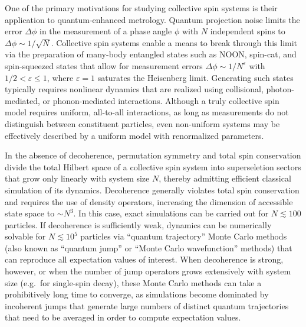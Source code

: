 \documentclass[pra,twocolumn,longbibliography]{revtex4-2}
\newcommand{\1}{\mathds{1}}
\begin{document}
One of the primary motivations for studying collective spin systems is
their application to quantum-enhanced metrology.  Quantum projection
noise limits the error $\Delta\phi$ in the measurement of a phase
angle $\phi$ with $N$ independent spins to
$\Delta\phi\sim1/\sqrt{N}$\cite{wineland1992spin, itano1993quantum,
  ma2011quantum}.  Collective spin systems enable a means to break
through this limit via the preparation of many-body entangled states
such as NOON\cite{jones2009magnetic, chen2010heralded,
  zhong2010simplified}, spin-cat\cite{agarwal1997atomic,
  lau2014proposal, huang2015quantum}, and spin-squeezed
states\cite{wineland1992spin, kitagawa1993squeezed, takano2009spin,
  appel2009mesoscopic, schleier-smith2010states,
  schleier-smith2010squeezing, leroux2010implementation,
  riedel2010atomchipbased, gross2010nonlinear, chen2011conditional,
  bohnet2014reduced, cox2016deterministic, hosten2016measurement,
  hosten2016quantum, lewis-swan2018robust, norcia2018cavitymediated,
  ma2011quantum, he2019engineering} that allow for measurement errors
$\Delta\phi\sim1/N^\varepsilon$ with $1/2<\varepsilon\le1$, where
$\varepsilon=1$ saturates the Heisenberg
limit\cite{zwierz2010general}.  Generating such states typically
requires nonlinear dynamics that are realized using collisional,
photon-mediated, or phonon-mediated interactions.  Although a truly
collective spin model requires uniform, all-to-all interactions, as
long as measurements do not distinguish between constituent particles,
even non-uniform systems may be effectively described by a uniform
model with renormalized parameters\cite{hu2015entangled}.

In the absence of decoherence, permutation symmetry and total spin
conservation divide the total Hilbert space of a collective spin
system into superseletion sectors that grow only linearly with system
size $N$, thereby admitting efficient classical simulation of its
dynamics.  Decoherence generally violates total spin conservation and
requires the use of density operators, increasing the dimension of
accessible state space to $\sim N^3$\cite{hartmann2016generalized,
  xu2013simulating}.  In this case, exact simulations can be carried
out for $N\lesssim100$ particles.  If decoherence is sufficiently
weak, dynamics can be numerically solvable for $N\lesssim10^5$
particles via ``quantum trajectory'' Monte Carlo
methods\cite{plenio1998quantumjump, zhang2018montecarlo} (also known
as ``quantum jump'' or ``Monte Carlo wavefunction'' methods) that can
reproduce all expectation values of interest.  When decoherence is
strong, however, or when the number of jump operators grows
extensively with system size (e.g.~for single-spin decay), these Monte
Carlo methods can take a prohibitively long time to converge, as
simulations become dominated by incoherent jumps that generate large
numbers of distinct quantum trajectories that need to be averaged in
order to compute expectation values.
\end{document}
